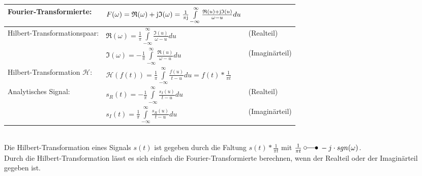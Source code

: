 			\begin{tabular}{| l | l l |}
				\hline
					Fourier-Transformierte: & $F(\omega) = \mathfrak{R}(\omega) + \im \mathfrak{I}(\omega)
					= \frac{1}{\pi \im} \int\limits_{-\infty}^{\infty}\frac{\mathfrak{R}(u) + \im \mathfrak{I}(u)}{\omega - u} du$ & \\
				\hline
					Hilbert-Transformationspaar: & $\mathfrak{R}(\omega) = \frac{1}{\pi} \int\limits_{-\infty}^{\infty} \frac{\mathfrak{I}(u)}{\omega - u} du$ & (Realteil)\\
					& $\mathfrak{I}(\omega) = -\frac{1}{\pi} \int\limits_{-\infty}^{\infty} \frac{\mathfrak{R}(u)}{\omega - u} du$ & (Imaginärteil)\\
				\hline
					Hilbert-Transformation $\mathcal{H}$: & $\mathcal{H}(f(t)) = \frac{1}{\pi} \int\limits_{-\infty}^{\infty} \frac{f(u)}{t-u} du
					= f(t) * \frac{1}{\pi t}$ & \\
				\hline
					Analytisches Signal: & $s_R(t) = - \frac{1}{\pi} \int\limits_{-\infty}^{\infty} \frac{s_I(u)}{t-u} du$ & (Realteil)\\
					& $s_I(t) = \frac{1}{\pi} \int\limits_{-\infty}^{\infty} \frac{s_R(u)}{t-u} du$ & (Imaginärteil)\\
				\hline
			\end{tabular}\\
		
			Die Hilbert-Transformation eines Signals $s(t)$ ist gegeben durch die Faltung $s(t) * \frac{1}{\pi t}$ mit $\frac{1}{\pi t} \; \laplace \; -j \cdot sgn(\omega)$.\\
			Durch die Hilbert-Transformation lässt es sich einfach die Fourier-Transformierte berechnen, wenn der Realteil oder der Imaginärteil gegeben
			ist.